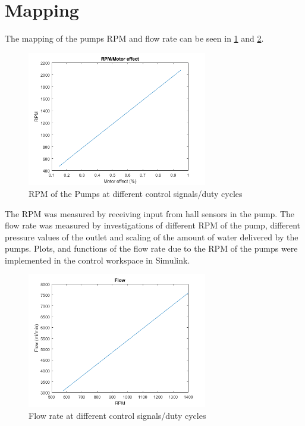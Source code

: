 \section{Mapping}
The mapping of the pumps RPM and flow rate can be seen in \ref{fig:RPM} and \ref{fig:Flowrate}.
\begin{figure}[H]
    \centering
    \includegraphics[width=0.7\textwidth]{RPM.png}
    \caption{RPM of the Pumps at different control signals/duty cycles}
    \label{fig:RPM}
\end{figure}
The RPM was measured by receiving input from hall sensors in the pump. The flow rate was measured by investigations of different RPM of the pump, different pressure values of the outlet and scaling of the amount of water delivered by the pumps. Plots, and functions of the flow rate due to the RPM of the pumps were implemented in the control workspace in Simulink.  
\begin{figure}[H]
    \centering
    \includegraphics[width=0.7\textwidth]{Flow.png}
    \caption{Flow rate at different control signals/duty cycles}
    \label{fig:Flowrate}
\end{figure}

\newpage

